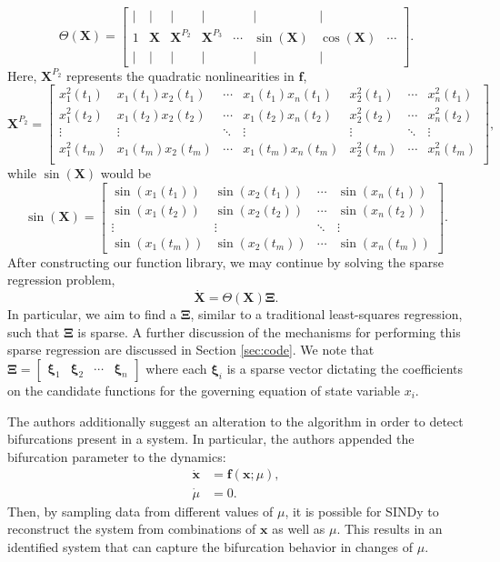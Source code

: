 \documentclass[10pt]{paper}
\begin{document}
\[  \Theta(\mathbf X) = \begin{bmatrix} \mid & \mid & \mid & \mid &  & \mid & \mid & \\ 1 & \mathbf X & {\mathbf X}^{P_2} & {\mathbf X}^{P_3} & \cdots & \sin{(\mathbf X)} & \cos{(\mathbf X)} & \cdots \\ \mid & \mid & \mid & \mid & & \mid & \mid & \end{bmatrix}.  \]
Here, $\mathbf X^{P_2}$ represents the quadratic nonlinearities in $\mathbf f$, 
\[ \mathbf X^{P_2} = \begin{bmatrix}
	x_1^2(t_1) & x_1(t_1)x_2(t_1) & \cdots & x_1(t_1)x_n(t_1) & x_2^2(t_1) & \cdots & x_n^2(t_1) \\
	x_1^2(t_2) & x_1(t_2)x_2(t_2) & \cdots & x_1(t_2)x_n(t_2) & x_2^2(t_2) & \cdots & x_n^2(t_2) \\
	\vdots & \vdots & \ddots & \vdots & \vdots & \ddots & \vdots \\
	x_1^2(t_m) & x_1(t_m)x_2(t_m) & \cdots & x_1(t_m)x_n(t_m) & x_2^2(t_m) & \cdots & x_n^2(t_m) \\
\end{bmatrix}, \]
while $\sin{(\mathbf X)}$ would be 
\[ \sin{(\mathbf X)} = \begin{bmatrix}
	\sin(x_1(t_1)) & \sin(x_2(t_1)) & \cdots & \sin(x_n(t_1)) \\ 
	\sin(x_1(t_2)) & \sin(x_2(t_2)) & \cdots & \sin(x_n(t_2)) \\
	\vdots & \vdots & \ddots & \vdots \\ 
	\sin(x_1(t_m)) & \sin(x_2(t_m)) & \cdots & \sin(x_n(t_m))
\end{bmatrix}. \]
After constructing our function library, we may continue by solving the sparse regression problem, 
\[ \mathbf {\dot X} = \Theta(\mathbf X)\mathbf \Xi. \]
In particular, we aim to find a $\mathbf \Xi$, similar to a traditional least-squares regression, such that $\mathbf \Xi$ is sparse. 
A further discussion of the mechanisms for performing this sparse regression are discussed in Section \ref{sec:code}. 
We note that $\mathbf \Xi = \begin{bmatrix}
	\boldsymbol \xi_1 & \boldsymbol \xi_2 & \cdots & \boldsymbol \xi_n
\end{bmatrix}$ where each $\boldsymbol \xi_i$ is a sparse vector dictating the coefficients on the candidate functions for the governing equation of state variable $x_i$. 

The authors additionally suggest an alteration to the algorithm in order to detect bifurcations present in a system. In particular, the authors appended the bifurcation parameter to the dynamics: 
\begin{equation} \label{eq:sindy_with_bifurcation}
	\begin{split}
		\mathbf {\dot x} &=  \mathbf{f}(\mathbf x; \mu), \\
		\dot \mu &= 0.
	\end{split}
\end{equation}
Then, by sampling data from different values of $\mu$, it is possible for SINDy to reconstruct the system from combinations of $\mathbf x$ as well as $\mu$. 
This results in an identified system that can capture the bifurcation behavior in changes of $\mu$. 
\end{document}
